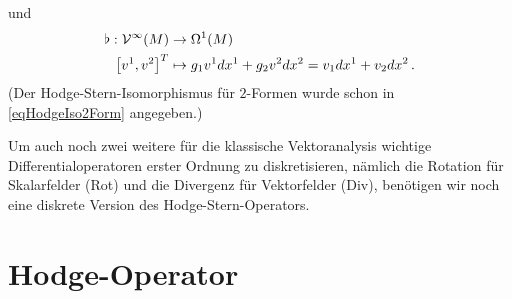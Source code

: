   und
  \begin{align}
    \begin{aligned}
      \flat: \mathcal{V}^{\infty}(M) &\rightarrow \Omega^{1}(M) \\
             \left[ v^{1}, v^{2} \right]^{T} &\mapsto g_{1}v^{1} dx^{1} + g_{2}v^{2} dx^{2} = v_{1} dx^{1} + v_{2} dx^{2} \,\text{.}
    \end{aligned}
  \end{align}
  (Der Hodge-Stern-Isomorphismus für \( 2 \)-Formen wurde schon in \eqref{eqHodgeIso2Form} angegeben.)
  
  Um auch noch zwei weitere für die klassische Vektoranalysis wichtige Differentialoperatoren erster Ordnung zu diskretisieren,
  nämlich die Rotation für Skalarfelder (Rot) und die Divergenz für Vektorfelder (Div), 
  benötigen wir noch eine diskrete Version des Hodge-Stern-Operators.
 

  

  

  

\section{Hodge-Operator}

